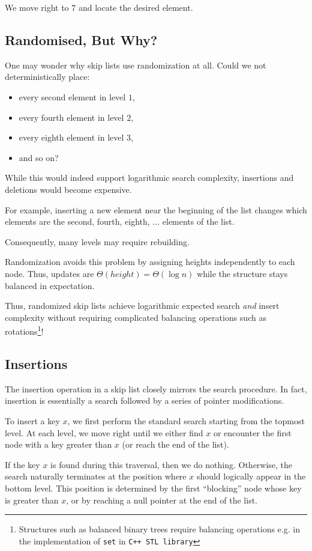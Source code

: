 \documentclass[11pt,openany]{book}
\begin{document}
We move right to \(7\) and locate the desired element.


\subsection{Randomised, But Why?}
One may wonder why skip lists use randomization at all.
Could we not deterministically place:
\begin{itemize}
\item every second element in level \(1\),
\item every fourth element in level \(2\),
\item every eighth element in level \(3\),
\item and so on?
\end{itemize}

While this would indeed support logarithmic search complexity, insertions and deletions would become expensive.

For example, inserting a new element near the beginning of the list changes which 
elements are the second, fourth, eighth, $\dots$ elements of the list.

Consequently, many levels may require rebuilding.

Randomization avoids this problem by assigning heights independently to each node.
Thus, updates are $\Theta(height)=\Theta(\log n)$ while the structure stays balanced in expectation.

Thus, randomized skip lists achieve logarithmic expected search \emph{and} insert complexity 
without requiring complicated balancing operations such as 
rotations\footnote{Structures such as balanced binary trees require 
balancing operations e.g. in the implementation of \texttt{set} in \texttt{C++ STL library}}!

\subsection{Insertions}

The insertion operation in a skip list closely mirrors the search procedure. 
In fact, insertion is essentially a search followed by a series of pointer modifications.

To insert a key \(x\), we first perform the standard search starting 
from the topmost level. At each level, we move right until we either find \(x\) or encounter 
the first node with a key greater than \(x\) (or reach the end of the list).

If the key \(x\) is found during this traversal, then we do nothing. Otherwise, the 
search naturally terminates at the position where \(x\) should logically appear 
in the bottom level. This position is determined by the first “blocking” node 
whose key is greater than \(x\), or by reaching a null pointer at the end of the list.
\end{document}
